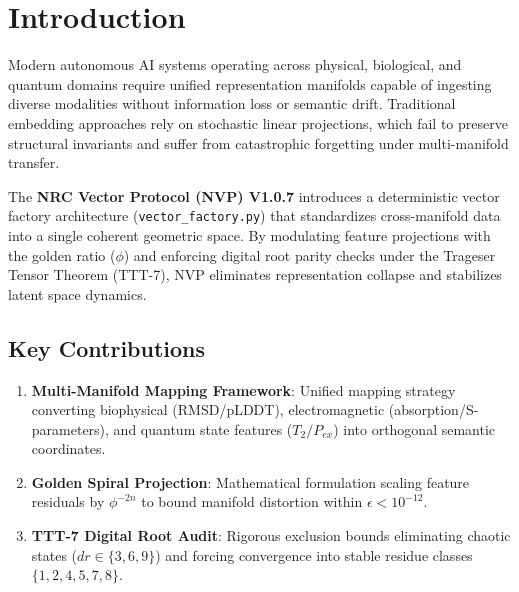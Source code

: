 \section{Introduction}
Modern autonomous AI systems operating across physical, biological, and quantum domains require unified representation manifolds capable of ingesting diverse modalities without information loss or semantic drift. Traditional embedding approaches rely on stochastic linear projections, which fail to preserve structural invariants and suffer from catastrophic forgetting under multi-manifold transfer.

The \textbf{NRC Vector Protocol (NVP) V1.0.7} introduces a deterministic vector factory architecture (\texttt{vector\_factory.py}) that standardizes cross-manifold data into a single coherent geometric space. By modulating feature projections with the golden ratio ($\phi$) and enforcing digital root parity checks under the Trageser Tensor Theorem (TTT-7), NVP eliminates representation collapse and stabilizes latent space dynamics.

\subsection{Key Contributions}
\begin{enumerate}[label=\textbf{\arabic*.}]
    \item \textbf{Multi-Manifold Mapping Framework}: Unified mapping strategy converting biophysical (RMSD/pLDDT), electromagnetic (absorption/S-parameters), and quantum state features ($T_2/P_{ex}$) into orthogonal semantic coordinates.
    \item \textbf{Golden Spiral Projection}: Mathematical formulation scaling feature residuals by $\phi^{-2n}$ to bound manifold distortion within $\epsilon < 10^{-12}$.
    \item \textbf{TTT-7 Digital Root Audit}: Rigorous exclusion bounds eliminating chaotic states ($dr \in \{3, 6, 9\}$) and forcing convergence into stable residue classes $\{1, 2, 4, 5, 7, 8\}$.
\end{enumerate}

